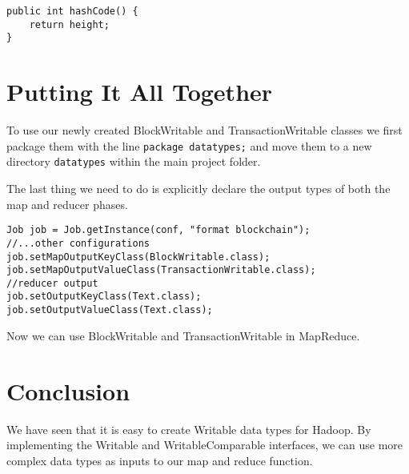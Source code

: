 \documentclass[9pt,twocolumn,twoside]{idsi}
\begin{document}
\begin{lstlisting}
public int hashCode() {
    return height;
}
\end{lstlisting}
\section{Putting It All Together}

To use our newly created BlockWritable and TransactionWritable classes we first package them with the line \lstinline{package datatypes;} and move them to a new directory \lstinline{datatypes} within the main project folder.

The last thing we need to do is explicitly declare the output types of both the map and reducer phases.

\begin{lstlisting}
Job job = Job.getInstance(conf, "format blockchain");
//...other configurations
job.setMapOutputKeyClass(BlockWritable.class);
job.setMapOutputValueClass(TransactionWritable.class);
//reducer output
job.setOutputKeyClass(Text.class);
job.setOutputValueClass(Text.class);
\end{lstlisting}

Now we can use BlockWritable and TransactionWritable in MapReduce.

\section{Conclusion}
We have seen that it is easy to create Writable data types for Hadoop. By implementing the Writable and WritableComparable interfaces, we can use more complex data types as inputs to our map and reduce function.
\end{document}
